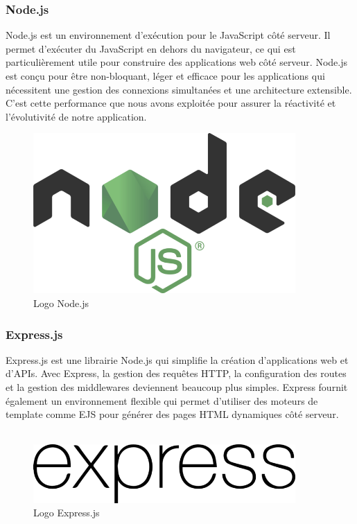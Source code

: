 \subsubsection*{Node.js}
Node.js est un environnement d'exécution pour le JavaScript côté serveur. Il permet d'exécuter du JavaScript en dehors du navigateur, ce qui est particulièrement utile pour construire des applications web côté serveur. Node.js est conçu pour être non-bloquant, léger et efficace pour les applications qui nécessitent une gestion des connexions simultanées et une architecture extensible. C'est cette performance que nous avons exploitée pour assurer la réactivité et l'évolutivité de notre application.

\begin{figure}[H]
\begin{center}
\includegraphics[width=10cm]{assets/presentation/Node_logo_NodeJS-700x428.png}
\end{center}
\caption{Logo Node.js}
\end{figure}

\subsubsection*{Express.js}
Express.js est une librairie Node.js qui simplifie la création d'applications web et d'APIs. Avec Express, la gestion des requêtes HTTP, la configuration des routes et la gestion des middlewares deviennent beaucoup plus simples. Express fournit également un environnement flexible qui permet d'utiliser des moteurs de template comme EJS pour générer des pages HTML dynamiques côté serveur.\\\\

\begin{figure}[H]
\begin{center}
\includegraphics[width=10cm]{assets/presentation/express.js_Logo-700x156.png}
\end{center}
\caption{Logo Express.js}
\end{figure}

